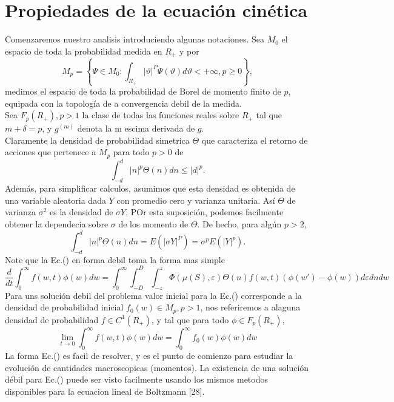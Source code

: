\documentclass[12pt]{article}
\begin{document}
\section*{Propiedades de la ecuación cinética}
Comenzaremos nuestro analisis introduciendo algunas notaciones. Sea $M_0$ el espacio de toda la probabilidad medida en $R_{+}$  y por 
\begin{equation}
M_p=\left\{\Psi \in M_0:\int_{R_{+}}|\vartheta|^{P}\Psi(\vartheta)d\vartheta<+\infty,p\geq 0 \right\},
\end{equation}
medimos el espacio de toda la probabilidad de Borel de momento finito de $p$, equipada con la topología de a convergencia debil de la medida.\\
\quad Sea $F_{p}(R_{+}),p>1$ la clase de todas las funciones reales sobre $R_{+}$ tal que $m+\delta=p$, y $g^{(m)}$ denota la m escima derivada de $g$.\\
\quad Claramente la densidad de probabilidad simetrica $\Theta$ que caracteriza el retorno de acciones que pertenece a $M_p$ para todo $p>0$ de
$$
\int^{d}_{-d}|n|^{p}\Theta(n)dn \leq |d|^{p}.
$$ 
Además, para simplificar calculos, asumimos que esta densidad es obtenida de una variable aleatoria dada $Y$ con promedio cero y varianza unitaria. Así $\Theta$ de varianza $\sigma^2$ es la densidad de $\sigma Y$. POr esta suposición, podemos facilmente obtener la dependecia sobre $\sigma$ de los momento de $\Theta$. De hecho, para algún $p>2$,
$$
\int^{d}_{-d}|n|^{p}\Theta(n)dn=E(|\sigma Y|^P)=\sigma^{p}E(|Y|^{p}).
$$ 
\quad Note que la Ec.(\cite{25}) en forma debil toma la forma mas simple
\begin{equation}
\frac{d}{dt}\int^{\infty}_{0} f(w,t)\phi(w)dw = \int^{\infty}_{0}\int^{D}_{-D}\int^{z}_{-z}\Phi(\mu(S),\varepsilon)\Theta(n)f(w,t)(\phi (w')-\phi(w))d\varepsilon dn dw \label{31}
\end{equation}
Para uns solución debil del problema valor inicial para la Ec.(\cite{ec26}) corresponde a la densidad de probabilidad inicial $f_0(w)\in M_{p}, p >1$, nos referiremos a alaguna densidad de probabilidad $f\in C^{1}(R_{+})$, y tal que para todo $\phi \in F_{p}(R_{+})$,
\begin{equation}
\lim_{t\rightarrow 0}\int^{\infty}_{0}f(w,t)\phi(w)dw=\int^{\infty}_{0}f_0(w)\phi(w)dw \label{32}
\end{equation}
La forma Ec.(\cite{ec31}) es facil de resolver, y es el punto de comienzo para estudiar la evolución de cantidades macroscopicas (momentos). La existencia de una solución débil para Ec.(\cite{25}) puede ser visto facilmente usando los mismos metodos disponibles para la ecuacion lineal de Boltzmann [28].\\
\end{document}
